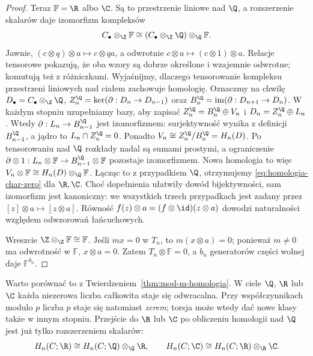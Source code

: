 \begin{proof}
Teraz $\mathbb F=\R$ albo $\C$.
Są to przestrzenie liniowe nad $\Q$, a
rozszerzenie skalarów daje izomorfizm
kompleksów
\[
 C_\bullet\otimes_{\Z}\mathbb F
 \cong (C_\bullet\otimes_{\Z}\Q)
             \otimes_{\Q}\mathbb F.
\]
Jawnie, $(c\otimes q)\otimes a\mapsto c\otimes qa$,
a odwrotnie $c\otimes a\mapsto(c\otimes1)\otimes a$.
Relacje tensorowe pokazują, że oba wzory są dobrze określone
i wzajemnie odwrotne; komutują też z różniczkami.
Wyjaśnijmy, dlaczego tensorowanie kompleksu
przestrzeni liniowych nad ciałem zachowuje
homologię. Oznaczmy na chwilę
$D_\bullet=C_\bullet\otimes_{\Z}\Q$,
$Z_n^\Q=\ker(\partial:D_n\to D_{n-1})$
oraz $B_n^\Q=\operatorname{im}(\partial:D_{n+1}\to D_n)$.
W każdym stopniu uzupełniamy bazy, aby zapisać
$Z_n^\Q=B_n^\Q\oplus V_n$ i
$D_n=Z_n^\Q\oplus L_n$.
Wtedy $\partial:L_n\to B_{n-1}^\Q$ jest
izomorfizmem: surjektywność wynika z definicji
$B_{n-1}^\Q$, a jądro to
$L_n\cap Z_n^\Q=0$. Ponadto
$V_n\cong Z_n^\Q/B_n^\Q=H_n(D)$.
Po tensorowaniu nad $\Q$ rozkłady nadal
są sumami prostymi, a ograniczenie
$\partial\otimes1:L_n\otimes\mathbb F
\to B_{n-1}^\Q\otimes\mathbb F$ pozostaje
izomorfizmem. Nowa homologia to więc
$V_n\otimes\mathbb F
\cong H_n(D)\otimes_{\Q}\mathbb F$.
Łącząc to z przypadkiem $\Q$, otrzymujemy
\eqref{eq:homologia-char-zero} dla $\R,\C$.
Choć dopełnienia ułatwiły dowód bijektywności, sam izomorfizm
jest kanoniczny: we wszystkich trzech przypadkach jest zadany
przez $[z]\otimes a\mapsto[z\otimes a]$.
Równość $f(z)\otimes a=(f\otimes\id)(z\otimes a)$ dowodzi
naturalności względem odwzorowań łańcuchowych.

Wreszcie $\Z\otimes_{\Z}\mathbb F\cong\mathbb F$.
Jeśli $mx=0$ w $T_n$, to
$m(x\otimes a)=0$; ponieważ $m\ne0$
ma odwrotność w $\mathbb F$,
$x\otimes a=0$. Zatem $T_n\otimes\mathbb F=0$,
a $b_n$ generatorów części wolnej daje
$\mathbb F^{b_n}$.
\end{proof}

Warto porównać to z Twierdzeniem~\ref{thm:mod-m-homologia}.
W ciele $\Q$, $\R$ lub $\C$ każda niezerowa
liczba całkowita staje się odwracalna.
Przy współczynnikach modulo $p$ liczba $p$
staje się natomiast \emph{zerem}; torsja
może wtedy dać nowe klasy także w innym stopniu.
Przejście do $\R$ lub $\C$ po obliczeniu
homologii nad $\Q$ jest już tylko
rozszerzeniem skalarów:
\[
 H_n(C;\R)\cong H_n(C;\Q)\otimes_{\Q}\R,
 \qquad
 H_n(C;\C)\cong H_n(C;\R)\otimes_{\R}\C.
\]

